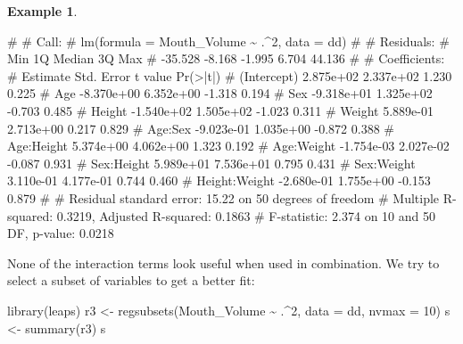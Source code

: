 \documentclass[
  a4paper,
]{article}
\newenvironment{Shaded}{\begin{snugshade}}{\end{snugshade}}
\newcommand{\AttributeTok}[1]{\textcolor[rgb]{0.77,0.63,0.00}{#1}}
\newcommand{\DecValTok}[1]{\textcolor[rgb]{0.00,0.00,0.81}{#1}}
\newcommand{\FunctionTok}[1]{\textcolor[rgb]{0.00,0.00,0.00}{#1}}
\newcommand{\NormalTok}[1]{#1}
\newcommand{\OtherTok}[1]{\textcolor[rgb]{0.56,0.35,0.01}{#1}}
\newcommand{\SpecialCharTok}[1]{\textcolor[rgb]{0.00,0.00,0.00}{#1}}
\theoremstyle{definition}
\theoremstyle{definition}
\newtheorem{example}{Example}[section]
\theoremstyle{definition}
\theoremstyle{definition}
\theoremstyle{remark}
\begin{document}
\begin{example}
\begin{Shaded}
\begin{Highlighting}[]
\NormalTok{\# }
\NormalTok{\# Call:}
\NormalTok{\# lm(formula = Mouth\_Volume \textasciitilde{} .\^{}2, data = dd)}
\NormalTok{\# }
\NormalTok{\# Residuals:}
\NormalTok{\#     Min      1Q  Median      3Q     Max }
\NormalTok{\# {-}35.528  {-}8.168  {-}1.995   6.704  44.136 }
\NormalTok{\# }
\NormalTok{\# Coefficients:}
\NormalTok{\#                 Estimate Std. Error t value Pr(\textgreater{}|t|)}
\NormalTok{\# (Intercept)    2.875e+02  2.337e+02   1.230    0.225}
\NormalTok{\# Age           {-}8.370e+00  6.352e+00  {-}1.318    0.194}
\NormalTok{\# Sex           {-}9.318e+01  1.325e+02  {-}0.703    0.485}
\NormalTok{\# Height        {-}1.540e+02  1.505e+02  {-}1.023    0.311}
\NormalTok{\# Weight         5.889e{-}01  2.713e+00   0.217    0.829}
\NormalTok{\# Age:Sex       {-}9.023e{-}01  1.035e+00  {-}0.872    0.388}
\NormalTok{\# Age:Height     5.374e+00  4.062e+00   1.323    0.192}
\NormalTok{\# Age:Weight    {-}1.754e{-}03  2.027e{-}02  {-}0.087    0.931}
\NormalTok{\# Sex:Height     5.989e+01  7.536e+01   0.795    0.431}
\NormalTok{\# Sex:Weight     3.110e{-}01  4.177e{-}01   0.744    0.460}
\NormalTok{\# Height:Weight {-}2.680e{-}01  1.755e+00  {-}0.153    0.879}
\NormalTok{\# }
\NormalTok{\# Residual standard error: 15.22 on 50 degrees of freedom}
\NormalTok{\# Multiple R{-}squared:  0.3219,  Adjusted R{-}squared:  0.1863 }
\NormalTok{\# F{-}statistic: 2.374 on 10 and 50 DF,  p{-}value: 0.0218}
\end{Highlighting}
\end{Shaded}

None of the interaction terms look useful when used in combination.
We try to select a subset of variables to get a better fit:

\begin{Shaded}
\begin{Highlighting}[]
\FunctionTok{library}\NormalTok{(leaps)}
\NormalTok{r3 }\OtherTok{\textless{}{-}} \FunctionTok{regsubsets}\NormalTok{(Mouth\_Volume }\SpecialCharTok{\textasciitilde{}}\NormalTok{ .}\SpecialCharTok{\^{}}\DecValTok{2}\NormalTok{, }\AttributeTok{data =}\NormalTok{ dd, }\AttributeTok{nvmax =} \DecValTok{10}\NormalTok{)}
\NormalTok{s }\OtherTok{\textless{}{-}} \FunctionTok{summary}\NormalTok{(r3)}
\NormalTok{s}
\end{Highlighting}
\end{Shaded}


\end{example}
\end{document}
